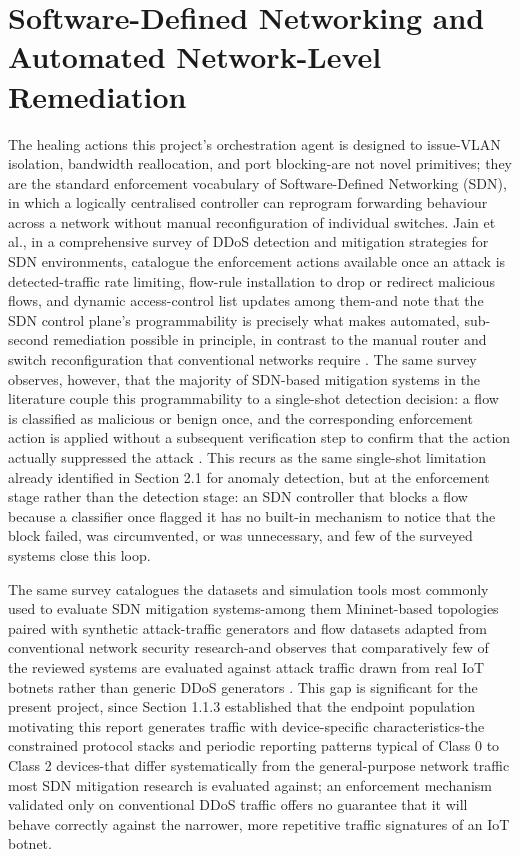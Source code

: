 \section{Software-Defined Networking and Automated Network-Level Remediation}

The healing actions this project's orchestration agent is designed to issue-VLAN isolation, bandwidth reallocation, and port blocking-are not novel primitives; they are the standard enforcement vocabulary of Software-Defined Networking (SDN), in which a logically centralised controller can reprogram forwarding behaviour across a network without manual reconfiguration of individual switches. Jain et al., in a comprehensive survey of DDoS detection and mitigation strategies for SDN environments, catalogue the enforcement actions available once an attack is detected-traffic rate limiting, flow-rule installation to drop or redirect malicious flows, and dynamic access-control list updates among them-and note that the SDN control plane's programmability is precisely what makes automated, sub-second remediation possible in principle, in contrast to the manual router and switch reconfiguration that conventional networks require \cite{Jain2024}. The same survey observes, however, that the majority of SDN-based mitigation systems in the literature couple this programmability to a single-shot detection decision: a flow is classified as malicious or benign once, and the corresponding enforcement action is applied without a subsequent verification step to confirm that the action actually suppressed the attack \cite{Jain2024}. This recurs as the same single-shot limitation already identified in Section 2.1 for anomaly detection, but at the enforcement stage rather than the detection stage: an SDN controller that blocks a flow because a classifier once flagged it has no built-in mechanism to notice that the block failed, was circumvented, or was unnecessary, and few of the surveyed systems close this loop.

The same survey catalogues the datasets and simulation tools most commonly used to evaluate SDN mitigation systems-among them Mininet-based topologies paired with synthetic attack-traffic generators and flow datasets adapted from conventional network security research-and observes that comparatively few of the reviewed systems are evaluated against attack traffic drawn from real IoT botnets rather than generic DDoS generators \cite{Jain2024}. This gap is significant for the present project, since Section 1.1.3 established that the endpoint population motivating this report generates traffic with device-specific characteristics-the constrained protocol stacks and periodic reporting patterns typical of Class 0 to Class 2 devices-that differ systematically from the general-purpose network traffic most SDN mitigation research is evaluated against; an enforcement mechanism validated only on conventional DDoS traffic offers no guarantee that it will behave correctly against the narrower, more repetitive traffic signatures of an IoT botnet.

